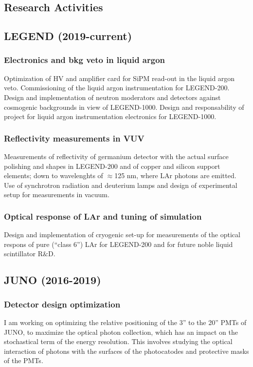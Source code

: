 \documentclass{article}
\begin{document}
\begin{vita}
\section*{Research Activities}
\subsection*{LEGEND (2019-current)}
\subsubsection*{Electronics and bkg veto in liquid argon}
Optimization of HV and amplifier card for SiPM read-out in the liquid argon veto. Commissioning of the liquid argon instrumentation for LEGEND-200. Design and implementation of neutron moderators and detectors against cosmogenic backgrounds in view of LEGEND-1000. Design and responsability of project for liquid argon instrumentation electronics for LEGEND-1000.

\subsubsection*{Reflectivity measurements in VUV}
Measurements of reflectivity of germanium detector with the actual surface polishing and shapes in LEGEND-200 and of copper and silicon support elements; down to wavelenghts of $\approx$125 nm, where LAr photons are emitted. Use of synchrotron radiation and deuterium lamps and design of experimental setup for measurements in vacuum. 

\subsubsection*{Optical response of LAr and tuning of simulation}
Design and implementation of cryogenic set-up for measurements of the optical respons of pure (``class 6'') LAr for LEGEND-200 and for future noble liquid scintillator R$\&$D.

\subsection*{JUNO (2016-2019)}
\subsubsection*{Detector design optimization}
I am working on optimizing the relative positioning of the 3'' to the 20'' PMTs of JUNO, to maximize the optical photon collection, which has an impact on the stochastical term of the energy resolution. This involves studying the optical interaction of photons with the surfaces of the photocatodes and protective masks of the PMTs.


\end{vita}
\end{document}
